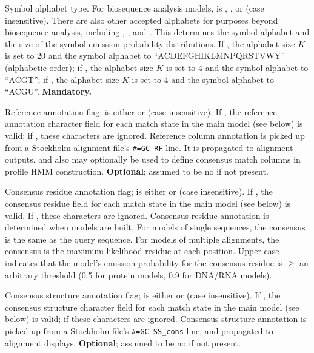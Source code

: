 \begin{sreitems}{}
\item [\emprog{ALPH <s>}] Symbol alphabet type. For biosequence
analysis models,  is , , or 
(case insensitive). There are also other accepted alphabets for
purposes beyond biosequence analysis, including ,
, and . This determines the symbol alphabet
and the size of the symbol emission probability distributions.  If
, the alphabet size $K$ is set to 20 and the symbol
alphabet to ``ACDEFGHIKLMNPQRSTVWY'' (alphabetic order); if
, the alphabet size $K$ is set to 4 and the symbol alphabet
to ``ACGT''; if , the alphabet size $K$ is set to 4 and the
symbol alphabet to ``ACGU''. \textbf{Mandatory.}

\item [\emprog{RF <s>}] Reference annotation flag;  is
either  or  (case insensitive). If , the
reference annotation character field for each match state in the main
model (see below) is valid; if , these characters are
ignored.  Reference column annotation is picked up from a Stockholm
alignment file's \verb+#=GC RF+ line. It is propagated to alignment
outputs, and also may optionally be used to define consensus match
columns in profile HMM construction. \textbf{Optional}; assumed to be
no if not present.

\item [\emprog{CONS <s>}] Consensus residue annotation flag;
   is either  or  (case insensitive).  If
  , the consensus residue field for each match state in the
  main model (see below) is valid. If , these characters are
  ignored. Consensus residue annotation is determined when models are
  built. For models of single sequences, the consensus is the same as
  the query sequence. For models of multiple alignments, the consensus
  is the maximum likelihood residue at each position. Upper case
  indicates that the model's emission probability for the consensus
  residue is $\geq$ an arbitrary threshold (0.5 for protein models,
  0.9 for DNA/RNA models).

\item [\emprog{CS <s>}] Consensus structure annotation flag;
 is either  or  (case insensitive). If
, the consensus structure character field for each match
state in the main model (see below) is valid; if  these
characters are ignored. Consensus structure annotation is picked up
from a Stockholm file's \verb+#=GC SS_cons+ line, and propagated to
alignment displays.  \textbf{Optional}; assumed to be no if not
present.


\end{sreitems}
